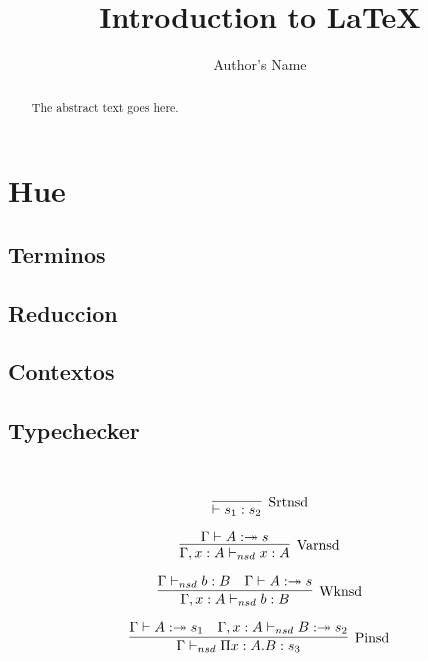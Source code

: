 \documentclass{article}
\begin{document}
\title{Introduction to \LaTeX{}}
\author{Author's Name}

\maketitle

\begin{abstract}
The abstract text goes here.
\end{abstract}

\section{Hue}


\subsection{Terminos}
\subsection{Reduccion}
\subsection{Contextos}
\subsection{Typechecker}
~\cite{Jutting93checkingalgorithms}
~\cite{Benthem:93}
~\cite{DBLP:conf/types/JuttingMP93}

\begin{equation}
    \label{simple_equation}
\infer[\mathrm{Srtnsd}]
{\vdash s_{1} : s_{2}}{}
\end{equation}

\begin{equation}
    \label{simple_equation}
\infer[\mathrm{Varnsd}]
{\Gamma, x:A \vdash_{nsd} x : A}{\Gamma \vdash A :\twoheadrightarrow s}
\end{equation}

\begin{equation}
    \label{simple_equation}
\infer[\mathrm{Wknsd}]
{\Gamma, x:A \vdash_{nsd} b : B}{\Gamma \vdash_{nsd} b : B & \Gamma \vdash A :\twoheadrightarrow s}
\end{equation}

\begin{equation}
    \label{simple_equation}
\infer[\mathrm{Pinsd}]
{\Gamma \vdash_{nsd} \Pi x:A.B :s_{3}}{\Gamma \vdash A :\twoheadrightarrow s_{1} & \Gamma, x:A \vdash_{nsd} B :\twoheadrightarrow s_{2}}
\end{equation}
\end{document}

